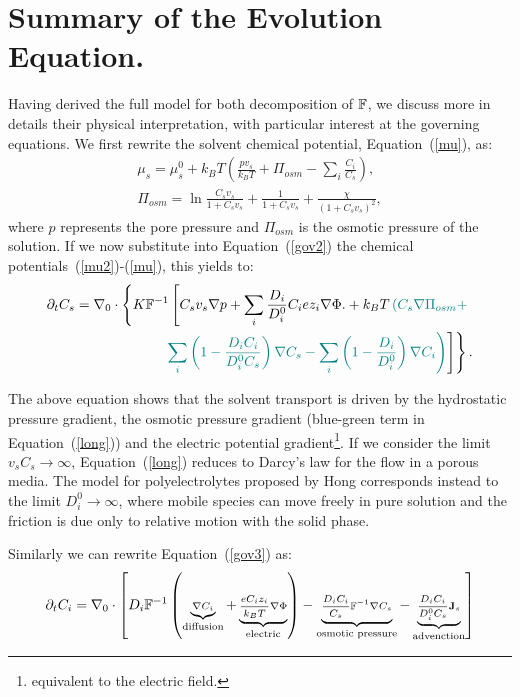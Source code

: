 \section{Summary of the Evolution Equation.}

Having derived the full model for both decomposition of $\mathbb{F}$, we discuss more in details their physical interpretation, with particular interest at the governing equations. We first rewrite the solvent chemical potential, Equation~(\ref{mu}), as:
\begin{gather}
\mu_s = \mu^0_s + k_B T \left(\frac{p v_s}{k_BT} +\Pi_{osm}-\sum_i \frac{C_i}{C_s}\right)\label{mu2},\\
\Pi_{osm}=\ln \frac{C_s v_s}{1+C_s v_s} + \frac{1}{1+C_sv_s}+\frac{\chi}{(1+C_s v_s)^2},
\end{gather}
where $p$ represents the pore pressure and $\Pi_{osm}$ is the osmotic pressure of the solution. If we now substitute into Equation~(\ref{gov2}) the chemical potentials~(\ref{mu2})-(\ref{mu}), this yields to:
\begin{equation}
\begin{aligned}
\partial_t C_s=\nabla_0 \cdot\left\{K\mathbb{F}^{-1}\left[C_s v_s\nabla p +\sum_i \frac{D_i}{D^0_i} C_i e z_i \nabla \Phi.+ k_B T\color{teal} \left(C_s \nabla \Pi_{osm}+  \right.\right.\right.\\
\left.\left.\left.\color{teal} \sum_i\left(1-\frac{D_iC_i}{D^0_iC_s}\right) \nabla C_s- \sum_i\left(1-\frac{D_i}{D^0_i}\right) \nabla C_i \right)\color{black}\right]\right\}.\label{long}
\end{aligned}
\end{equation}

The above equation shows that the solvent transport is driven by the hydrostatic pressure gradient, the osmotic pressure gradient (blue-green term in Equation~(\ref{long})) and the electric potential gradient\footnote{equivalent to the electric field.}. If we consider the limit $v_sC_s\rightarrow\infty$, Equation~(\ref{long}) reduces to Darcy's law for the flow in a porous media. The model for polyelectrolytes proposed by Hong \cite{Reviewpolyel} corresponds instead to the limit $D^0_i\rightarrow\infty$, where mobile species can move freely in pure solution and the friction is due only to relative motion with the solid phase.

Similarly we can rewrite Equation~(\ref{gov3}) as:
\begin{equation}
\scriptsize
\partial_t C_i = \nabla_0 \cdot\left[D_i\mathbb{F}^{-1}\left(\underbrace{\nabla C_i}_{\text{diffusion}} +\underbrace{\frac{eC_iz_i}{k_B T} \nabla \Phi}_{\text{electric}}\right)-\underbrace{\frac{D_i C_i}{C_s}\mathbb{F}^{-1}\nabla C_s}_{\text{osmotic pressure}}-\underbrace{\frac{D_i C_i}{D^0_iC_s}\mathbf{J}_s}_{\text{advenction}}\right]\label{long2}
\end{equation}

